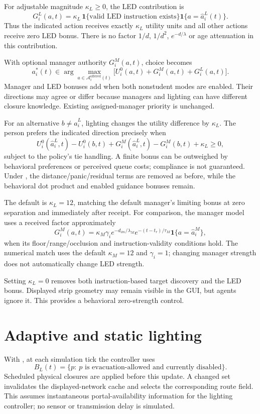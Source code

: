 \documentclass[11pt]{article}
\newcommand{\code}[1]{\texttt{\detokenize{#1}}}
\newcommand{\ind}{\mathbf{1}}
\begin{document}
For adjustable magnitude $\kappa_L\geq0$, the LED contribution is
\[
 \boxed{\displaystyle
 G_i^L(a,t)=\kappa_L\,
      \ind\{\text{valid LED instruction exists}\}
      \ind\{a=\widehat a_i^L(t)\}.}
\]
Thus the indicated action receives exactly $\kappa_L$ utility units and all
other actions receive zero LED bonus. There is no factor $1/d$, $1/d^2$,
$e^{-d/\lambda}$ or age attenuation in this contribution.

With optional manager authority $G_i^M(a,t)$, choice becomes
\[
 a_i^*(t)\in\arg\max_{a\in\mathcal A_i^{\mathrm{offered}}(t)}
       \bigl[U_i^0(a,t)+G_i^M(a,t)+G_i^L(a,t)\bigr].
\]
Manager and LED bonuses add when both nonstudent modes are enabled. Their
directions may agree or differ because managers and lighting can have different
closure knowledge. Existing assigned-manager priority is unchanged.

For an alternative $b\ne\widehat a_i^L$, lighting changes the utility difference
by $\kappa_L$. The person prefers the indicated direction precisely when
\[
 U_i^0(\widehat a_i^L,t)-U_i^0(b,t)
 +G_i^M(\widehat a_i^L,t)-G_i^M(b,t)+\kappa_L\geq0,
\]
subject to the policy's tie handling. A finite bonus can be outweighed by
behavioral preferences or perceived queue costs; compliance is not guaranteed.
Under \code{behavioralOnly=true}, the distance/panic/residual terms are removed
as before, while the behavioral dot product and enabled guidance bonuses remain.

The default is $\kappa_L=12$, matching the default manager's limiting bonus
at zero separation and immediately after receipt. For comparison, the manager
model uses a received factor approximately
\[
 G_i^M(a,t)=\kappa_M\gamma_i e^{-d_{im}/\lambda_M}
            e^{-(t-t_r)/\tau_M}\ind\{a=\widehat a_i^M\},
\]
when its floor/range/occlusion and instruction-validity conditions hold.
The numerical match uses the default $\kappa_M=12$ and $\gamma_i=1$;
changing manager strength does not automatically change LED strength.

Setting $\kappa_L=0$ removes both instruction-based target discovery and the
LED bonus. Displayed strip geometry may remain visible in the GUI, but agents
ignore it. This provides a behavioral zero-strength control.

\section{Adaptive and static lighting}
With \code{adaptive=true}, at each simulation tick the controller uses
\[
 B_L(t)=\{p:\ p\text{ is evacuation-allowed and currently disabled}\}.
\]
Scheduled physical closures are applied before this update. A changed set
invalidates the displayed-network cache and selects the corresponding route
field. This assumes instantaneous portal-availability information for the
lighting controller; no sensor or transmission delay is simulated.
\end{document}
